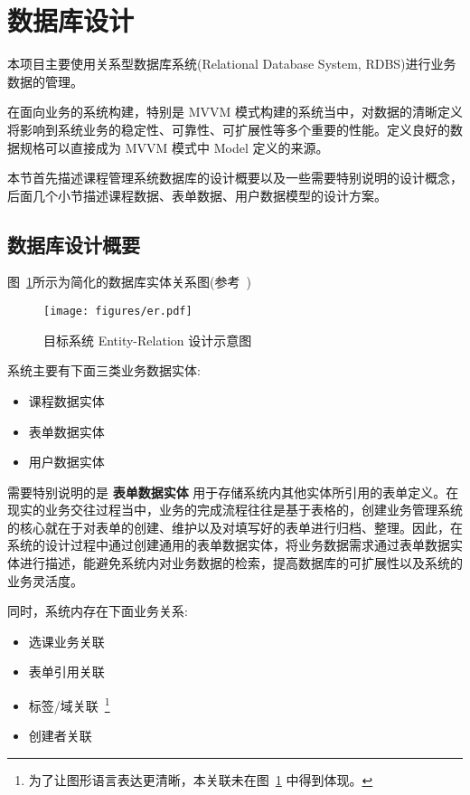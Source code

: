 \section{数据库设计\label{sec:Database}}

本项目主要使用关系型数据库系统(Relational Database System, RDBS)进行业务数据的管理。

在面向业务的系统构建，特别是 MVVM 模式构建的系统当中，对数据的清晰定义将影响到系统业务的稳定性、可靠性、可扩展性等多个重要的性能。定义良好的数据规格可以直接成为 MVVM 模式中 Model 定义的来源。

本节首先描述课程管理系统数据库的设计概要以及一些需要特别说明的设计概念，后面几个小节描述课程数据、表单数据、用户数据模型的设计方案。

\newpage

\subsection{数据库设计概要}

图~\ref{DatabaseOverview}所示为简化的数据库实体关系图(参考~)

\begin{figure}[!h]
  \begin{center}
    \texttt{[image: figures/er.pdf]}
    \caption{目标系统 Entity-Relation 设计示意图\label{DatabaseOverview}}
  \end{center}
\end{figure}

系统主要有下面三类业务数据实体:

\begin{itemize}
  \item 课程数据实体
  \item 表单数据实体
  \item 用户数据实体
\end{itemize}

需要特别说明的是 \textbf{表单数据实体} 用于存储系统内其他实体所引用的表单定义。在现实的业务交往过程当中，业务的完成流程往往是基于表格的，创建业务管理系统的核心就在于对表单的创建、维护以及对填写好的表单进行归档、整理。因此，在系统的设计过程中通过创建通用的表单数据实体，将业务数据需求通过表单数据实体进行描述，能避免系统内对业务数据的检索，提高数据库的可扩展性以及系统的业务灵活度。

同时，系统内存在下面业务关系:

\begin{itemize}
  \item 选课业务关联
  \item 表单引用关联
  \item 标签/域关联~\footnote{为了让图形语言表达更清晰，本关联未在图~\ref{DatabaseOverview} 中得到体现。}
  \item 创建者关联
\end{itemize}

